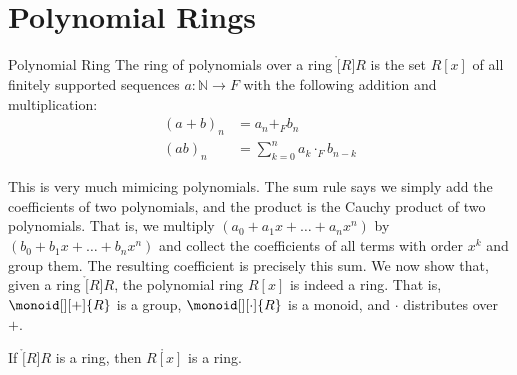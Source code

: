 \documentclass{article}                                                        %
\begin{document}
    \section{Polynomial Rings}
        \begin{fdefinition}{Polynomial Ring}
            The ring of polynomials over a ring $\ring[R]{R}$ is the set $R[x]$
            of all finitely supported sequences $a:\mathbb{N}\rightarrow{F}$
            with the following addition and multiplication:
            \begin{align}
                (a+b)_{n}&=a_{n}+_{F}b_{n}\\
                (ab)_{n}&=\sum_{k=0}^{n}a_{k}\cdot_{F}b_{n-k}
            \end{align}
        \end{fdefinition}
        This is very much mimicing polynomials. The sum rule says we simply add
        the coefficients of two polynomials, and the product is the Cauchy
        product of two polynomials. That is, we multiply
        $(a_{0}+a_{1}x+\dots+a_{n}x^{n})$ by $(b_{0}+b_{1}x+\dots+b_{n}x^{n})$
        and collect the coefficients of all terms with order $x^{k}$ and group
        them. The resulting coefficient is precisely this sum. We now show that,
        given a ring $\ring[R]{R}$, the polynomial ring $R[x]$ is indeed a ring.
        That is, $\monoid[][+]{R}$ is a group, $\monoid[][\cdot]{R}$ is a
        monoid, and $\cdot$ distributes over $+$.
        \begin{theorem}
            If $\ring[R]{R}$ is a ring, then $\ring{R[x]}$ is a ring.
        \end{theorem}
\end{document}
